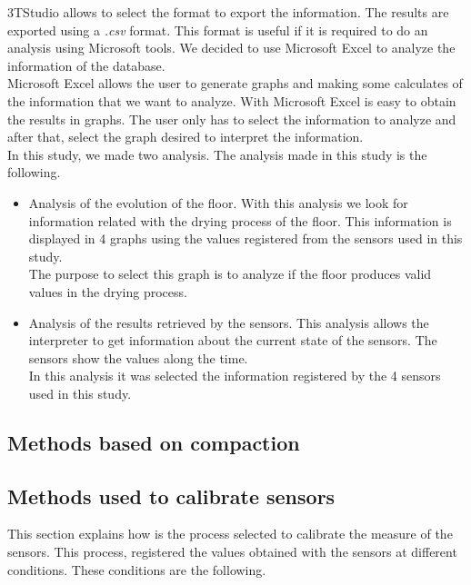 3TStudio allows to select the format to export the information. The results are exported using a \textit{.csv} format. This format is useful if it is required to do an analysis using Microsoft tools. We decided to use Microsoft Excel to analyze the information of the database.\\


Microsoft Excel allows the user to generate graphs and making some calculates of the information that we want to analyze. With Microsoft Excel is easy to obtain the results in graphs. The user only has to select the information to analyze and after that, select the graph desired to interpret the information.\\

In this study, we made two analysis. The analysis made in this study is the following.

\begin{itemize}

\item Analysis of the evolution of the floor. With this analysis we look for information related with the drying process of the floor. This information is displayed in 4 graphs using the values registered from the sensors used in this study.\\

The purpose to select this graph is to analyze if the floor produces valid values in the drying process.

\item Analysis of the results retrieved by the sensors. This analysis allows the interpreter to get information about the current state of the sensors. The sensors show the values along the time.\\

In this analysis it was selected the information registered by the 4 sensors used in this study.

\end{itemize}

\subsection{Methods based on compaction}

\subsection{Methods used to calibrate sensors}

This section explains how is the process selected to calibrate the measure of the sensors. This process, registered the values obtained with the sensors at different conditions. These conditions are the following.

